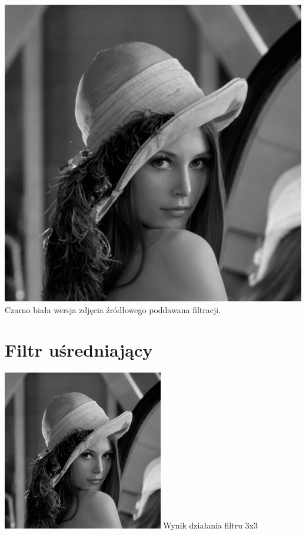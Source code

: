 \documentclass[a4paper,12pt,openany]{report}
\begin{document}
\begin{center}
\includegraphics[width=15cm]{resources/modified/lena_gray.jpg}
\linebreak
\tiny{Czarno biała wersja zdjęcia źródłowego poddawana filtracji.}
\end{center}

\pagebreak
\section{Filtr uśredniający}

\begin{center}
\includegraphics[width=7cm]{resources/modified/lena/lena_blur_3x3.jpg}
\linebreak
\tiny{Wynik działania filtru 3x3}
\end{center}
\end{document}
